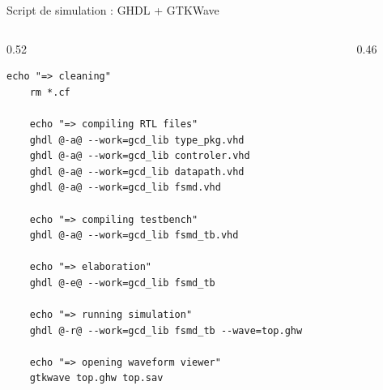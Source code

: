 \begin{frame}[fragile,t]{Script de simulation :  GHDL + GTKWave}
  \begin{columns}[T]
    \begin{column}{0.52\textwidth}
    \begin{lstlisting}[style=shell]
    echo "=> cleaning"
    rm *.cf

    echo "=> compiling RTL files"
    ghdl @-a@ --work=gcd_lib type_pkg.vhd
    ghdl @-a@ --work=gcd_lib controler.vhd
    ghdl @-a@ --work=gcd_lib datapath.vhd
    ghdl @-a@ --work=gcd_lib fsmd.vhd

    echo "=> compiling testbench"
    ghdl @-a@ --work=gcd_lib fsmd_tb.vhd

    echo "=> elaboration"
    ghdl @-e@ --work=gcd_lib fsmd_tb

    echo "=> running simulation"
    ghdl @-r@ --work=gcd_lib fsmd_tb --wave=top.ghw

    echo "=> opening waveform viewer"
    gtkwave top.ghw top.sav
    \end{lstlisting}
    \end{column}

    \begin{column}{0.46\textwidth}
    \end{column}
  \end{columns}
\end{frame}
